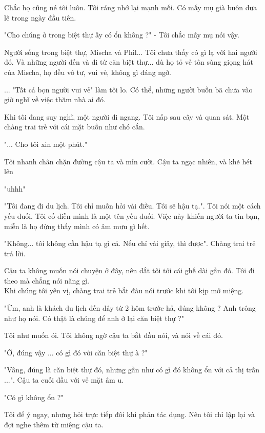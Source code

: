 Chắc họ cũng né tôi luôn. Tôi ráng nhớ lại mạnh mối. Có mấy mụ già buôn dưa lê trong ngày đầu tiên.

"Cho chúng ở trong biệt thự ấy có ổn không ?" - Tôi chắc mấy mụ nói vậy.

Người sống trong biệt thự, Mischa và Phil... Tôi chưa thấy có gì lạ với hai người đó. Và những người đến và đi từ căn biệt thự... dù họ tỏ vẻ tôn sùng giọng hát của Mischa, họ đều vô tư, vui vẻ, không gì đáng ngờ.

... "Tất cả bọn người vui vẻ" làm tôi lo. Có thể, những người buồn bã chưa vào giờ nghĩ về việc thăm nhà ai đó.

Khi tôi đang suy nghĩ, một người đi ngang. Tôi nấp sau cây và quan sát. Một chàng trai trẻ với cái mặt buồn như chó cắn.

"... Cho tôi xin một phút."

Tôi nhanh chân chặn đường cậu ta và mỉn cười. Cậu ta ngạc nhiên, và khẽ hét lên

"uhhh"

"Tôi đang đi du lịch. Tôi chỉ muốn hỏi vài điều. Tôi sẽ hậu tạ.". Tôi nói một cách yếu đuối. Tôi cố diễn mình là một tên yếu đuối. Việc này khiến người ta tin bạn, miễn là họ đừng thấy mình có âm mưu gì hết.

"Không... tôi không cần hậu tạ gì cả. Nếu chỉ vài giây, thì được". Chàng trai trẻ trả lời.

Cậu ta không muốn nói chuyện ở đây, nên dắt tôi tới cái ghế dài gần đó. Tôi đi theo mà chẳng nói năng gì. \\


Khi chúng tôi yên vị, chàng trai trẻ bắt đàu nói trước khi tôi kịp mở miệng.

"Ừm, anh là khách du lịch đến đây từ 2 hôm trước hả, đúng không ? Anh trông như họ nói. Có thật là chúng để anh ở lại căn biệt thự ?"

Tôi như muốn ói. Tôi không ngờ cậu ta bắt đầu nói, và nói về cái đó.

"Ờ, đúng vậy ... có gì đó với căn biệt thự à ?"

"Vâng, đúng là căn biệt thự đó, nhưng gần như có gì đó không ổn với cả thị trấn ...". Cậu ta cuối đầu với vẻ mặt âm u.

"Có gì không ổn ?"

Tôi để ý ngay, nhưng hỏi trực tiếp đôi khi phản tác dụng. Nên tôi chỉ lập lại và đợi nghe thêm từ miệng cậu ta.

